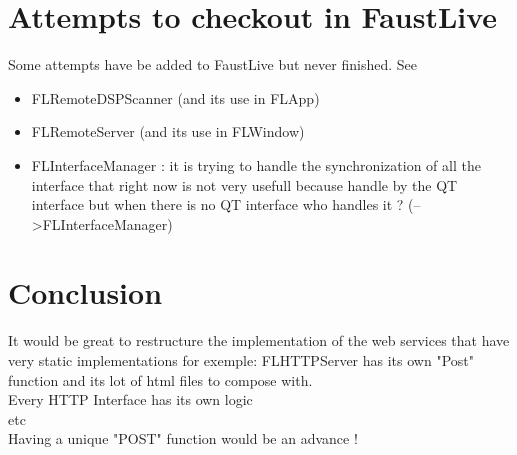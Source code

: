 \documentclass[a4paper]{article}
\begin{document}
\section{Attempts to checkout in FaustLive}

Some attempts have be added to FaustLive but never finished. See
\begin{itemize}
\item FLRemoteDSPScanner (and its use in FLApp)
\item FLRemoteServer (and its use in FLWindow)
\item FLInterfaceManager : it is trying to handle the synchronization of all the interface that right now is not very usefull because handle by the QT interface but when there is no QT interface who handles it ? (-->FLInterfaceManager)
\end{itemize}
\section{Conclusion}

It would be great to restructure the implementation of the web services that have very static implementations for exemple:
FLHTTPServer has its own "Post" function and its lot of html files to compose with. \\
Every HTTP Interface has its own logic \\
etc \\

Having a unique "POST" function would be an advance !
\end{document}
